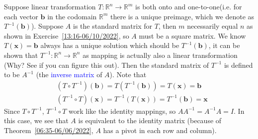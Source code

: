\documentclass{beamer}
\theoremstyle{definition}
\theoremstyle{remark}
\begin{document}
\begin{frame}[t]
\begin{definition}
Suppose linear transformation $T:\mathbb R^n\to\mathbb R^m$ is both onto and one-to-one\pause (i.e. for each vector $\mathbf b$ in the codomain $\mathbb R^m$ there is a unique preimage, which we denote as $T^{-1}(\mathbf b)$)\pause. Suppose $A$ is the standard matrix for $T$, then $m$ necessarily equal $n$ as shown in Exercise~\ref{13:16-06/10/2022}, so $A$ must be a square matrix\pause. We know $T(\mathbf x)=\mathbf b$ always has a unique solution which should be $T^{-1}(\mathbf b)$, it can be shown that $T^{-1}:\mathbb R^n\to\mathbb R^n$ as mapping is actually also a linear transformation (Why? See if you can figure this out)\pause. Then the standard matrix of $T^{-1}$ is defined to be $A^{-1}$ (the \textcolor{blue}{inverse matrix} of $A$)\pause. Note that
\begin{align*}
&(T\circ T^{-1})(\mathbf b)=T(T^{-1}(\mathbf b))=T(\mathbf x)=\mathbf b\\
&(T^{-1}\circ T)(\mathbf x)=T^{-1}(T(\mathbf x))=T^{-1}(\mathbf b)=\mathbf x
\end{align*}\pause
Since $T\circ T^{-1}$, $T^{-1}\circ T$ work like the identity mappings\pause, so $AA^{-1}=A^{-1}A=I$\pause. In this case, we see that $A$ is equivalent to the identity matrix (because of Theorem~\ref{06:35-06/06/2022}, $A$ has a pivot in each row and column).
\end{definition}
\end{frame}
\end{document}

